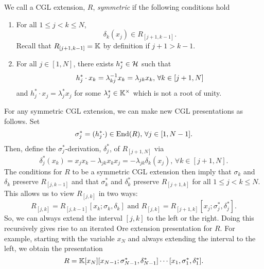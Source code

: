 \begin{definition}
	We call a CGL extension, $R$, \emph{symmetric} if the following conditions hold
	\begin{enumerate}
		\item For all $1\leq j < k \leq N$,
		      \begin{equation*}
			      \delta_k (x_j) \in R_{[j+1, k-1]}.
		      \end{equation*}
			  Recall that $R_{[j+1,k-1]} = \mathbb{K}$ by definition if $j +1 > k-1$.
		\item For all $j \in [1, N]$, there exists $h^*_j \in \mathcal{H}$ such that
		      \begin{equation*}
			      h^*_j \cdot x_k = \lambda_{kj}^{-1} x_k = \lambda_{jk}x_k, \, \forall k \in [j+1, N]
		      \end{equation*}
		      and $h^*_j \cdot x_j = \lambda^*_j x_j$ for some $\lambda_j^*\in \mathbb{K}^\times$ which is not a root of unity.
	\end{enumerate}
\end{definition}
For any symmetric CGL extension, we can make new CGL presentations as follows. Set
\begin{equation*}
	\sigma_j^* = (h_j^* \cdot) \in \operatorname{End}(R),\, \forall j \in [1, N-1].
\end{equation*}
Then, define the $\sigma_j^*$-derivation, $\delta_j^*$, of $R_{[j+1, N]}$ via
\begin{equation*}
	\delta_j^*(x_k) = x_j x_k - \lambda_{jk}x_kx_j = -\lambda_{jk} \delta_k (x_j), \, \forall k \in [j+1, N].
\end{equation*}
%
The conditions for $R$ to be a symmetric CGL extension then imply that $\sigma_k$ and
$\delta_k$ preserve $R_{[j, k-1]}$ and that $\sigma_k^*$ and $\delta_k^*$ preserve
$R_{[j+1, k]}$ for all $1 \leq j < k \leq N$. This allows us to view $R_{[j, k]}$ in
two ways:
\begin{equation*}
	R_{[j, k]} = R_{[j, k-1]}[x_k; \sigma_k, \delta_k] \text{ and } R_{[j,k]} = R_{[j+1, k]}[x_j; \sigma_j^*, \delta_j^*].
\end{equation*}
So, we can always extend the interval $[j, k]$ to the left or the right. Doing this recursively gives rise to an iterated Ore extension presentation for $R$. For example, starting with the variable $x_N$ and always extending the interval to the left, we obtain the presentation
\begin{equation*}
	R = \mathbb{K}[x_N][x_{N-1}; \sigma_{N-1}^*, \delta_{N-1}^*]\cdots [x_1, \sigma_1^*, \delta_1^*].
\end{equation*}
